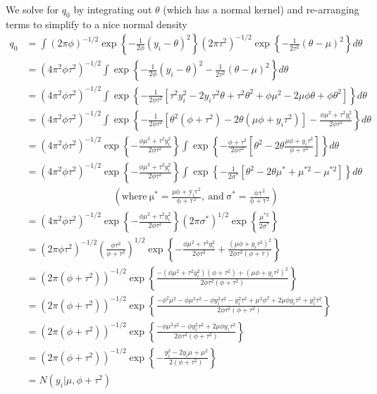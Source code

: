 \documentclass[12pt]{article}
\begin{document}
We solve for $q_0$ by integrating out $\theta$ (which has a normal kernel) and re-arranging terms to simplify to a nice normal density
\begin{align*}
q_0 &= \int (2\pi\phi)^{-1/2}\exp\left\{-\frac{1}{2\phi}(y_i-\theta)^2\right\}(2\pi\tau^2)^{-1/2}\exp\left\{-\frac{1}{2\tau^2}(\theta-\mu)^2\right\}d\theta \\
 &= (4\pi^2\phi\tau^2)^{-1/2} \int \exp\left\{-\frac{1}{2\phi}(y_i-\theta)^2-\frac{1}{2\tau^2}(\theta-\mu)^2\right\}d\theta \\
 &= (4\pi^2\phi\tau^2)^{-1/2} \int \exp\left\{-\frac{1}{2\phi\tau^2}\left[\tau^2y_i^2-2y_i\tau^2\theta +\tau^2\theta^2 + \phi\mu^2 - 2\mu\phi\theta + \phi\theta^2\right]\right\}d\theta \\
 &= (4\pi^2\phi\tau^2)^{-1/2} \int \exp\left\{-\frac{1}{2\phi\tau^2}\left[ \theta^2(\phi+\tau^2) -2\theta(\mu\phi+y_i\tau^2)\right] -\frac{\phi\mu^2+\tau^2y_i^2}{2\phi\tau^2}\right\}d\theta \\
 &= (4\pi^2\phi\tau^2)^{-1/2}\exp\left\{-\frac{\phi\mu^2+\tau^2y_i^2}{2\phi\tau^2}\right\} \int \exp\left\{-\frac{\phi+\tau^2}{2\phi\tau^2}\left[ \theta^2 -2\theta\frac{\mu\phi+y_i\tau^2}{\phi+\tau^2}\right]\right\}d\theta \\
 &= (4\pi^2\phi\tau^2)^{-1/2}\exp\left\{-\frac{\phi\mu^2+\tau^2y_i^2}{2\phi\tau^2}\right\} \int \exp\left\{-\frac{1}{2\sigma^*}\left[ \theta^2 -2\theta \mu^* +\mu^{*2} - \mu^{*2}\right]\right\}d\theta \\
& \mathrm{~~~~~~~~~~~~~~~~~~~~~~~~~~~~~~~~~~~~~~~~(where~\mu^*=\frac{\mu\phi+y_i\tau^2}{\phi+\tau^2},~and~\sigma^* = \frac{\phi\tau^2}{\phi + \tau^2})} \\
 &= (4\pi^2\phi\tau^2)^{-1/2}\exp\left\{-\frac{\phi\mu^2+\tau^2y_i^2}{2\phi\tau^2}\right\} (2\pi\sigma^*)^{1/2}\exp\left\{\frac{\mu^{*2}}{2\sigma^*}\right\} \\
 &= (2\pi\phi\tau^2)^{-1/2}\left(\frac{\phi\tau^2}{\phi+\tau^2}\right)^{1/2}\exp\left\{-\frac{\phi\mu^2+\tau^2y_i^2}{2\phi\tau^2} + \frac{(\mu\phi+y_i\tau^2)^2}{2\phi\tau^2(\phi+\tau)}\right\} \\
 &= (2\pi(\phi+\tau^2))^{-1/2}\exp\left\{\frac{-(\phi\mu^2+\tau^2y_i^2)(\phi+\tau^2) + (\mu\phi+y_i\tau^2)^2}{2\phi\tau^2(\phi+\tau^2)}\right\} \\
 &= (2\pi(\phi+\tau^2))^{-1/2}\exp\left\{\frac{-\phi^2\mu^2-\phi\mu^2\tau^2-\phi y_i^2\tau^2-y_i^2\tau^2 + \mu^2\phi^2+2\mu\phi y_i\tau^2 + y_i^2\tau^2}{2\phi\tau^2(\phi+\tau^2)}\right\} \\
 &= (2\pi(\phi+\tau^2))^{-1/2}\exp\left\{\frac{-\phi\mu^2\tau^2-\phi y_i^2\tau^2+2\mu\phi y_i\tau^2}{2\phi\tau^2(\phi+\tau^2)}\right\} \\
 &= (2\pi(\phi+\tau^2))^{-1/2}\exp\left\{-\frac{y_i^2 - 2y_i\mu + \mu^2}{2(\phi+\tau^2)}\right\} \\
 &= N(y_i|\mu, \phi+\tau^2)
\end{align*}
\end{document}
